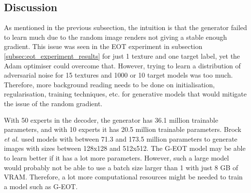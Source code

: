 \subsection{Discussion}

As mentioned in the previous subsection, the intuition is that the generator failed to learn much due to the random image renders not giving a stable enough gradient. This issue was seen in the EOT experiment in subsection \ref{subsec:eot_experiment_results} for just 1 texture and one target label, yet the Adam optimiser could overcome that. However, trying to learn a distribution of adversarial noise for 15 textures and 1000 or 10 target models was too much. Therefore, more background reading needs to be done on initialisation, regularisation, training techniques, etc. for generative models that would mitigate the issue of the random gradient.

With 50 experts in the decoder, the generator has 36.1 million trainable parameters, and with 10 experts it has 20.5 million trainable parameters. Brock \textit{et al.} \cite{big_gan} used models with between 71.3 and 173.5 million parameters to generate images with sizes between 128x128 and 512x512. The G-EOT model may be able to learn better if it has a lot more parameters. However, such a large model would probably not be able to use a batch size larger than 1 with just 8 GB of VRAM. Therefore, a lot more computational resources might be needed to train a model such as G-EOT.

